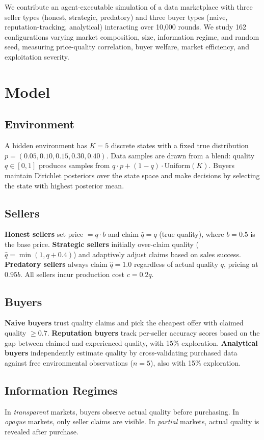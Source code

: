 \documentclass[11pt]{article}
\begin{document}
We contribute an agent-executable simulation of a data marketplace with three seller types (honest, strategic, predatory) and three buyer types (naive, reputation-tracking, analytical) interacting over 10{,}000 rounds.
We study 162 configurations varying market composition, size, information regime, and random seed, measuring price-quality correlation, buyer welfare, market efficiency, and exploitation severity.

\section{Model}

\subsection{Environment}
A hidden environment has $K=5$ discrete states with a fixed true distribution $p = (0.05, 0.10, 0.15, 0.30, 0.40)$.
Data samples are drawn from a blend: quality $q \in [0,1]$ produces samples from $q \cdot p + (1-q) \cdot \text{Uniform}(K)$.
Buyers maintain Dirichlet posteriors over the state space and make decisions by selecting the state with highest posterior mean.

\subsection{Sellers}
\textbf{Honest sellers} set price $= q \cdot b$ and claim $\hat{q} = q$ (true quality), where $b=0.5$ is the base price.
\textbf{Strategic sellers} initially over-claim quality ($\hat{q} = \min(1, q + 0.4)$) and adaptively adjust claims based on sales success.
\textbf{Predatory sellers} always claim $\hat{q}=1.0$ regardless of actual quality $q$, pricing at $0.95b$.
All sellers incur production cost $c = 0.2q$.

\subsection{Buyers}
\textbf{Naive buyers} trust quality claims and pick the cheapest offer with claimed quality $\geq 0.7$.
\textbf{Reputation buyers} track per-seller accuracy scores based on the gap between claimed and experienced quality, with 15\% exploration.
\textbf{Analytical buyers} independently estimate quality by cross-validating purchased data against free environmental observations ($n=5$), also with 15\% exploration.

\subsection{Information Regimes}
In \emph{transparent} markets, buyers observe actual quality before purchasing.
In \emph{opaque} markets, only seller claims are visible.
In \emph{partial} markets, actual quality is revealed after purchase.
\end{document}
